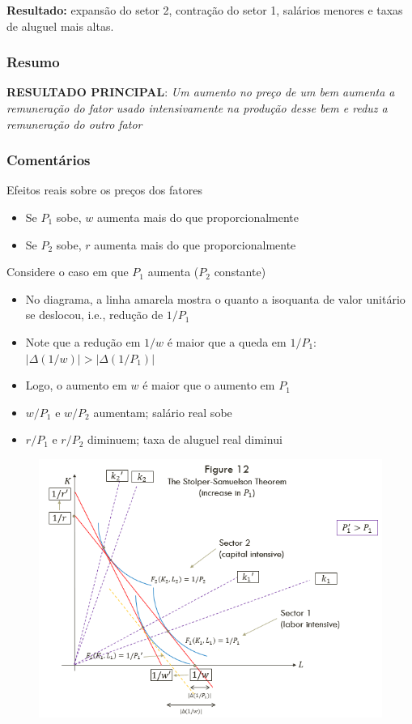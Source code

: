 \documentclass[a4paper,12pt]{article}[abntex2]
\begin{document}
\textbf{Resultado:} expansão do setor 2, contração do setor 1, salários menores e taxas de aluguel mais altas.

\subsubsection{\textbf{Resumo}}
\textbf{RESULTADO PRINCIPAL}: \textit{Um aumento no preço de um bem aumenta a remuneração do fator usado intensivamente na produção desse bem e reduz a remuneração do outro fator}

\subsubsection{\textbf{Comentários}}
Efeitos reais sobre os preços dos fatores
\begin{itemize}
    \item Se \(P_1\) sobe, \(w\) aumenta mais do que proporcionalmente
    \item Se \(P_2\) sobe, \(r\) aumenta mais do que proporcionalmente
\end{itemize}

Considere o caso em que \(P_1\) aumenta (\(P_2\) constante)
\begin{itemize}
    \item No diagrama, a linha amarela mostra o quanto a isoquanta de valor unitário se deslocou, i.e., redução de \(1/P_1\)
    \item Note que a redução em \(1/w\) é maior que a queda em \(1/P_1\): \( |\Delta(1/w)| > |\Delta(1/P_1)| \)
    \item Logo, o aumento em \(w\) é maior que o aumento em \(P_1\)
    \item \(w/P_1\) e \(w/P_2\) aumentam; salário real sobe
    \item \(r/P_1\) e \(r/P_2\) diminuem; taxa de aluguel real diminui
\end{itemize}

\begin{figure}[H]
    \centering
    \includegraphics[width=0.7\linewidth]{Imagens/a10i12.png}
\end{figure}
\end{document}
